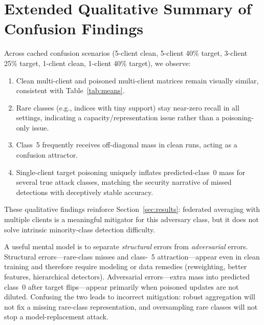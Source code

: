 \documentclass[journal]{IEEEtran}
\begin{document}
\section{Extended Qualitative Summary of Confusion Findings}
\label{app:conf}
Across cached confusion scenarios (5-client clean, 5-client 40\% target, 3-client 25\% target, 1-client clean, 1-client 40\% target), we observe:
\begin{enumerate}
\item Clean multi-client and poisoned multi-client matrices remain visually similar, consistent with Table~\ref{tab:means}.
\item Rare classes (e.g., indices with tiny support) stay near-zero recall in all settings, indicating a capacity/representation issue rather than a poisoning-only issue.
\item Class~5 frequently receives off-diagonal mass in clean runs, acting as a confusion attractor.
\item Single-client target poisoning uniquely inflates predicted-class~0 mass for several true attack classes, matching the security narrative of missed detections with deceptively stable accuracy.
\end{enumerate}
These qualitative findings reinforce Section~\ref{sec:results}: federated averaging with multiple clients is a meaningful mitigator for this adversary class, but it does not solve intrinsic minority-class detection difficulty.

A useful mental model is to separate \emph{structural} errors from \emph{adversarial} errors. Structural errors---rare-class misses and class-~5 attraction---appear even in clean training and therefore require modeling or data remedies (reweighting, better features, hierarchical detectors). Adversarial errors---extra mass into predicted class~0 after target flips---appear primarily when poisoned updates are not diluted. Confusing the two leads to incorrect mitigation: robust aggregation will not fix a missing rare-class representation, and oversampling rare classes will not stop a model-replacement attack.
\end{document}
